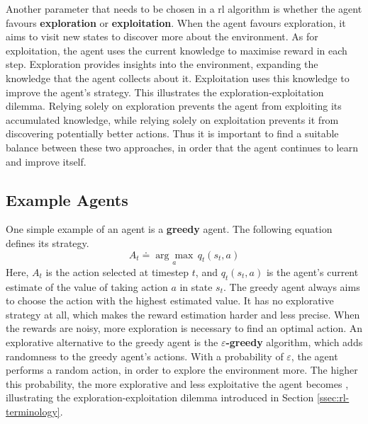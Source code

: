 Another parameter that needs to be chosen in a \ac{rl} algorithm is whether the agent favours \textbf{exploration} or \textbf{exploitation}. When the agent favours exploration, it aims to visit new states to discover more about the environment. As for exploitation, the agent uses the current knowledge to maximise reward in each step. Exploration provides insights into the environment, expanding the knowledge that the agent collects about it. Exploitation uses this knowledge to improve the agent's strategy. This illustrates the exploration-exploitation dilemma. Relying solely on exploration prevents the agent from exploiting its accumulated knowledge, while relying solely on exploitation prevents it from discovering potentially better actions. Thus it is important to find a suitable balance between these two approaches, in order that the agent continues to learn and improve itself.

\subsection{Example Agents}\label{ssec:example-agents}
One simple example of an agent is a \textbf{greedy} agent. The following equation defines its strategy. 
\[A_t \doteq \underset{a}{\arg\max}\, q_t(s_t, a)\]
Here, $A_t$ is the action selected at timestep $t$, and $q_t(s_t, a)$ is the agent's current estimate of the value of taking action $a$ in state $s_t$. The greedy agent always aims to choose the action with the highest estimated value. 
It has no explorative strategy at all, which makes the reward estimation harder and less precise. When the rewards are noisy, more exploration is necessary to find an optimal action. An explorative alternative to the greedy agent is the \textbf{$\varepsilon$-greedy} algorithm, which adds randomness to the greedy agent's actions. With a probability of $\varepsilon$, the agent performs a random action, in order to explore the environment more. The higher this probability, the more explorative and less exploitative the agent becomes \cite{rl_introduction}, illustrating the exploration-exploitation dilemma introduced in Section \ref{ssec:rl-terminology}.

